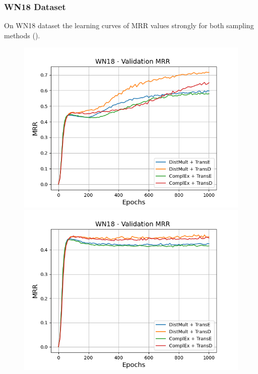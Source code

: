\subsubsection{WN18 Dataset}
\label{subsubsec:uncertainty_wn18}
%
On \textsc{WN18} dataset the learning curves of MRR values strongly for both sampling methods ().
\begin{figure}
    \centering
    \begin{minipage}{.5\textwidth}
      \centering
      \includegraphics[width=0.9\linewidth]{figures/results/gan_train/not_pretrained/random/wn18/epochs1000/random_wn18_mrrs.png}
    \end{minipage}%
    \begin{minipage}{.5\textwidth}
      \centering
      \includegraphics[width=0.9\linewidth]{figures/results/gan_train/not_pretrained/uncertainty/max_distribution/entropy/wn18/1k_epochs/uncertainty_wn18_mrrs.png}

\end{minipage}
\end{figure}

